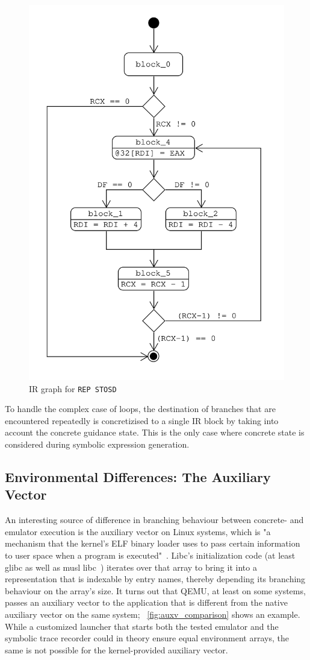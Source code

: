 \begin{figure}[htpb]
    \centering
    \includegraphics[width=0.7\linewidth]{figures/ir_graph_repstosd.png}
    \caption{IR graph for \texttt{REP STOSD}}\label{fig:ir_graph_repstod}
\end{figure}

To handle the complex case of loops, the destination of branches that are encountered repeatedly is concretizised to a
single IR block by taking into account the concrete guidance state. This is the only case where concrete state is
considered during symbolic expression generation.

\subsection{Environmental Differences: The Auxiliary Vector}\label{sec:auxv}

An interesting source of difference in branching behaviour between concrete- and emulator execution is the auxiliary
vector on Linux systems, which is "a mechanism that the kernel's ELF binary loader uses to pass certain information to
user space when a program is executed"~\cite{getauxval2024Mar}. Libc's initialization code (at least glibc as well as
musl libc~\cite{MuslLibc2024Feb}) iterates over that array to bring it into a representation that is indexable by entry
names, thereby depending its branching behaviour on the array's size. It turns out that QEMU, at least on some systems,
passes an auxiliary vector to the application that is different from the native auxiliary vector on the same system;
\figurename~\ref{fig:auxv_comparison} shows an example. While a customized launcher that starts both the tested emulator
and the symbolic trace recorder could in theory ensure equal environment arrays, the same is not possible for the
kernel-provided auxiliary vector.

